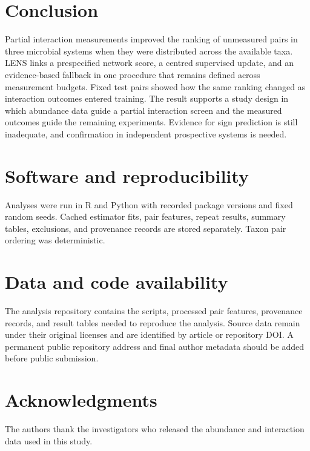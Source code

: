 \documentclass[11pt]{article}
\begin{document}
\section{Conclusion}

Partial interaction measurements improved the ranking of unmeasured pairs in three microbial systems when they were distributed across the available taxa.
LENS links a prespecified network score, a centred supervised update, and an evidence-based fallback in one procedure that remains defined across measurement budgets.
Fixed test pairs showed how the same ranking changed as interaction outcomes entered training.
The result supports a study design in which abundance data guide a partial interaction screen and the measured outcomes guide the remaining experiments.
Evidence for sign prediction is still inadequate, and confirmation in independent prospective systems is needed.

\section{Software and reproducibility}

Analyses were run in R and Python with recorded package versions and fixed random seeds.
Cached estimator fits, pair features, repeat results, summary tables, exclusions, and provenance records are stored separately.
Taxon pair ordering was deterministic.

\section*{Data and code availability}

The analysis repository contains the scripts, processed pair features, provenance records, and result tables needed to reproduce the analysis.
Source data remain under their original licenses and are identified by article or repository DOI.
A permanent public repository address and final author metadata should be added before public submission.

\section*{Acknowledgments}

The authors thank the investigators who released the abundance and interaction data used in this study.



\end{document}
